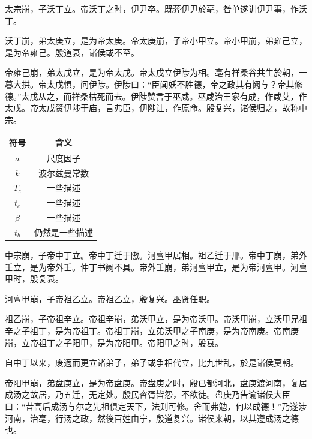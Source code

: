 \documentclass[UTF8,12pt,AutoFakeBold,fontset=fandol]{ctexart}
\begin{document}
	太宗崩，子沃丁立。帝沃丁之时，伊尹卒。既葬伊尹於亳，咎单遂训伊尹事，作沃丁。
	
	沃丁崩，弟太庚立，是为帝太庚。帝太庚崩，子帝小甲立。帝小甲崩，弟雍己立，是为帝雍己。殷道衰，诸侯或不至。
	
	帝雍己崩，弟太戊立，是为帝太戊。帝太戊立伊陟为相。亳有祥桑谷共生於朝，一暮大拱。帝太戊惧，问伊陟。伊陟曰：“臣闻妖不胜德，帝之政其有阙与？帝其修德。”太戊从之，而祥桑枯死而去。伊陟赞言于巫咸。巫咸治王家有成，作咸艾，作太戊。帝太戊赞伊陟于庙，言弗臣，伊陟让，作原命。殷复兴，诸侯归之，故称中宗。
	\begin{table}[htb]
		\centering
		\captionsetup{font=footnotesize}
		\label{表：符号对照表}
		\begin{tabular}{@{}cc@{}}
			\toprule
			符号          & 含义                                                              \\ \midrule
			$a$         & 尺度因子                                                            \\
			$k$         & 波尔兹曼常数                                                          \\
			$T_c$       & 一些描述                                                   \\
			$t_c$       & 一些描述                                                   \\
			$\beta$     & 一些描述                                           \\
			$t_b$       & 仍然是一些描述                                                        \\ \bottomrule
		\end{tabular}
	\end{table}
	中宗崩，子帝中丁立。帝中丁迁于隞。河亶甲居相。祖乙迁于邢。帝中丁崩，弟外壬立，是为帝外壬。仲丁书阙不具。帝外壬崩，弟河亶甲立，是为帝河亶甲。河亶甲时，殷复衰。
	
	河亶甲崩，子帝祖乙立。帝祖乙立，殷复兴。巫贤任职。
	
	祖乙崩，子帝祖辛立。帝祖辛崩，弟沃甲立，是为帝沃甲。帝沃甲崩，立沃甲兄祖辛之子祖丁，是为帝祖丁。帝祖丁崩，立弟沃甲之子南庚，是为帝南庚。帝南庚崩，立帝祖丁之子阳甲，是为帝阳甲。帝阳甲之时，殷衰。
	
	自中丁以来，废適而更立诸弟子，弟子或争相代立，比九世乱，於是诸侯莫朝。
	
	帝阳甲崩，弟盘庚立，是为帝盘庚。帝盘庚之时，殷已都河北，盘庚渡河南，复居成汤之故居，乃五迁，无定处。殷民咨胥皆怨，不欲徙。盘庚乃告谕诸侯大臣曰：“昔高后成汤与尔之先祖俱定天下，法则可修。舍而弗勉，何以成德！”乃遂涉河南，治亳，行汤之政，然後百姓由宁，殷道复兴。诸侯来朝，以其遵成汤之德也。
	
\end{document}
